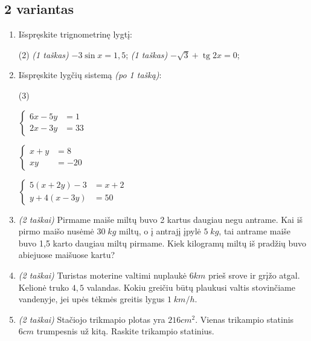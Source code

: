 \documentclass[a4paper]{article}
\DeclareMathOperator{\tg}{tg}
\begin{document}
\subsection*{2 variantas}

\begin{enumerate}
      \item Išspręskite trignometrinę lygtį:
            \begin{tasks}[item-format={\normalfont}, after-item-skip=4mm](2)
                  \task \textit{(1 taškas)} $-3\sin{x}=1,5$;
                  \task \textit{(1 taškas)} $-\sqrt{3}+\tg{2x}=0$;
            \end{tasks}

      \item Išspręskite lygčių sistemą \textit{(po 1 tašką)}:
            \begin{tasks}[item-format={\normalfont}, after-item-skip=4mm](3)
                  \task   \par\vspace{-1.3\baselineskip}%
                  $\left\{\begin{aligned}
                              6x - 5y & = 1  \\
                              2x - 3y & = 33
                        \end{aligned}\right.$

                  \task   \par\vspace{-1.3\baselineskip}%
                  $\left\{\begin{aligned}
                              x + y & = 8   \\
                              xy    & = -20
                        \end{aligned}\right.$
                  \task   \par\vspace{-1.3\baselineskip}%
                  $\left\{\begin{aligned}
                              5(x + 2y) -3 & = x+2 \\
                              y+4(x-3y)    & = 50
                        \end{aligned}\right.$
            \end{tasks}
      \item \textit{(2 taškai)} Pirmame maiše miltų buvo 2 kartus daugiau negu antrame. Kai iš pirmo maišo nusėmė $30\; kg$ miltų, o į antrajį įpylė $5\; kg$, tai antrame maiše buvo 1,5 karto daugiau miltų pirmame. Kiek kilogramų miltų iš pradžių buvo abiejuose maišuose kartu?
      \item \textit{(2 taškai)} Turistas moterine valtimi nuplaukė $6 km$ prieš srove ir grįžo atgal. Kelionė truko $4,5$ valandas. Kokiu greičiu būtų plaukusi valtis stovinčiame vandenyje, jei upės tėkmės greitis lygus $1 \; km/h$.
      \item \textit{(2 taškai)} Stačiojo trikmapio plotas yra $216 cm^2$. Vienas trikampio statinis $6 cm$ trumpesnis už kitą. Raskite trikampio statinius.
\end{enumerate}
\end{document}
